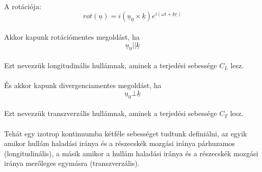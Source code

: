 \documentclass[a4paper]{article}
\begin{document}
\\
A rotációja:
\begin{equation}
rot (\underline{u})= i(\underline{u}_0 \times \underline{k}) e^{i(\omega t + \underline{k} \underline{r})}
\end{equation}
\\
Akkor kapunk rotációmentes megoldást, ha
\begin{equation}
\underline{u}_0 ||\underline{k}
\end{equation}
\\
Ezt nevezzük longitudinális hullámnak, aminek a terjedési sebessége $C_L$ lesz.
\\
\\
És akkor kapunk divergenciamentes megoldást, ha
\begin{equation}
\underline{u}_0 \bot \underline{k}
\end{equation}
\\
Ezt nevezzük transzverzális hullámnak, aminek a terjedési sebessége $C_T$ lesz.
\\ 
\\
Tehát egy izotrop kontinuumba kétféle sebességet tudtunk definiálni, az egyik amikor hullám haladási iránya és a részecskék mozgási iránya párhuzamos (longitudinális), a másik amikor a hullám haladási iránya és a részecskék mozgási iránya merőleges egymásra (transzverzális).
\\
\end{document}
